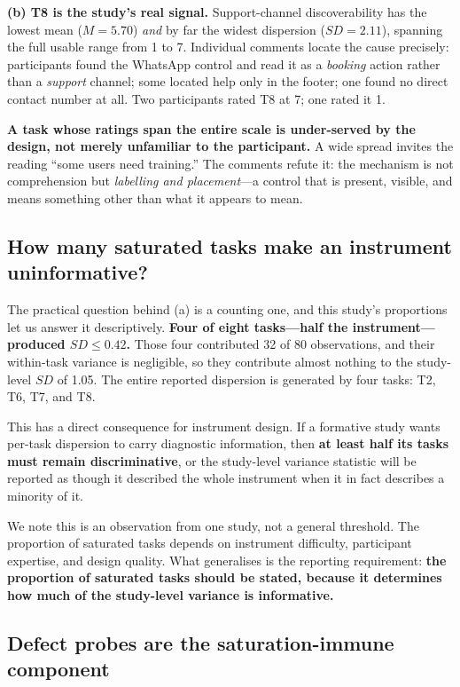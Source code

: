\documentclass[conference]{IEEEtran}
\begin{document}
\textbf{(b) T8 is the study's real signal.} Support-channel discoverability has
the lowest mean ($M=5.70$) \emph{and} by far the widest dispersion
($SD=2.11$), spanning the full usable range from 1 to 7. Individual comments
locate the cause precisely: participants found the WhatsApp control and read it
as a \emph{booking} action rather than a \emph{support} channel; some located
help only in the footer; one found no direct contact number at all. Two
participants rated T8 at 7; one rated it 1.

\textbf{A task whose ratings span the entire scale is under-served by the
design, not merely unfamiliar to the participant.} A wide spread invites the
reading ``some users need training.'' The comments refute it: the mechanism is
not comprehension but \emph{labelling and placement}---a control that is
present, visible, and means something other than what it appears to mean.

\subsection{How many saturated tasks make an instrument uninformative?}

The practical question behind (a) is a counting one, and this study's
proportions let us answer it descriptively. \textbf{Four of eight tasks---half
the instrument---produced $SD\leq0.42$.} Those four contributed 32 of 80
observations, and their within-task variance is negligible, so they contribute
almost nothing to the study-level $SD$ of 1.05. The entire reported dispersion
is generated by four tasks: T2, T6, T7, and T8.

This has a direct consequence for instrument design. If a formative study wants
per-task dispersion to carry diagnostic information, then \textbf{at least half
its tasks must remain discriminative}, or the study-level variance statistic
will be reported as though it described the whole instrument when it in fact
describes a minority of it.

We note this is an observation from one study, not a general threshold. The
proportion of saturated tasks depends on instrument difficulty, participant
expertise, and design quality. What generalises is the reporting requirement:
\textbf{the proportion of saturated tasks should be stated, because it
determines how much of the study-level variance is informative.}

\subsection{Defect probes are the saturation-immune component}
\end{document}
